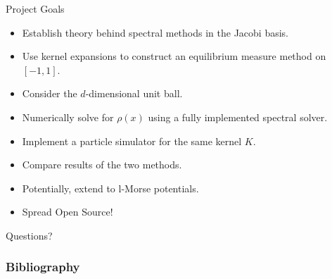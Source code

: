 \documentclass[aspectratio=169,hyperref={colorlinks=true}]{beamer}
\begin{document}
  \begin{frame}{Project Goals}
    \begin{itemize}
      \item Establish theory behind spectral methods in the Jacobi basis.
      \item Use kernel expansions to construct an equilibrium measure method on $[-1, 1]$.
      \item Consider the $d$-dimensional unit ball.
      \item Numerically solve for $\rho(x)$ using a fully implemented spectral solver.
      \item Implement a particle simulator for the same kernel $K$.
      \item Compare results of the two methods.
      \item Potentially, extend to l-Morse potentials.
      \item Spread Open Source!
    \end{itemize}
  \end{frame}

  \begin{frame}{}
    Questions?
  \end{frame}

  \begin{frame}[allowframebreaks]
    \frametitle{Bibliography}
    \nocite{*}
    \printbibliography[heading=bibnumbered]
  \end{frame}
\end{document}
